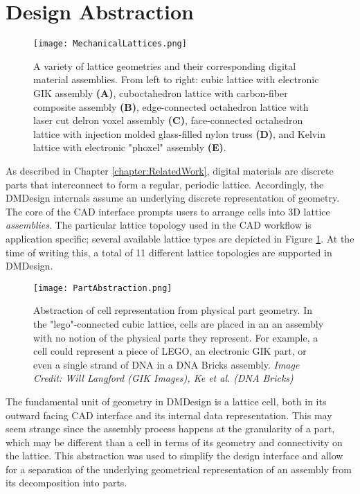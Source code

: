 {\section{Design Abstraction}

\begin{figure}
  \texttt{[image: MechanicalLattices.png]}
  \caption{A variety of lattice geometries and their corresponding digital material assemblies.  From left to right: cubic lattice with electronic GIK assembly \textbf{(A)}, cuboctahedron lattice with carbon-fiber composite assembly \textbf{(B)}, edge-connected octahedron lattice with laser cut delron voxel assembly \textbf{(C)}, face-connected octahedron lattice with injection molded glass-filled nylon truss \textbf{(D)}, and Kelvin lattice with electronic "phoxel" assembly \textbf{(E)}.}
  \label{fig:MechanicalLattices}
\end{figure}

As described in Chapter \ref{chapter:RelatedWork}, digital materials are discrete parts that interconnect to form a regular, periodic lattice.  Accordingly, the DMDesign internals assume an underlying discrete representation of geometry.  The core of the CAD interface prompts users to arrange cells into 3D lattice \textit{assemblies}.  The particular lattice topology used in the CAD workflow is application specific; several available lattice types are depicted in Figure \ref{fig:MechanicalLattices}.  At the time of writing this, a total of 11 different lattice topologies are supported in DMDesign.\\

\begin{figure}
  \texttt{[image: PartAbstraction.png]}
  \caption{Abstraction of cell representation from physical part geometry.  In the "lego"-connected cubic lattice, cells are placed in an an assembly with no notion of the physical parts they represent.  For example, a cell could represent a piece of LEGO, an electronic GIK part, or even a single strand of DNA in a DNA Bricks assembly.  \textit{Image Credit: Will Langford (GIK Images), Ke et al. (DNA Bricks)} \cite{Ke2012}}
  \label{fig:PartAbstraction}
\end{figure}

The fundamental unit of geometry in DMDesign is a lattice cell, both in its outward facing CAD interface and its internal data representation.  This may seem strange since the assembly process happens at the granularity of a part, which may be different than a cell in terms of its geometry and connectivity on the lattice.  This abstraction was used to simplify the design interface and allow for a separation of the underlying geometrical representation of an assembly from its decomposition into parts.\\

}
